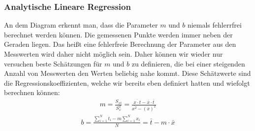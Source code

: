 \documentclass[letterpaper,10pt,english]{jupyterBook}
\begin{document}
\subsubsection{Analytische Lineare Regression }
\label{\detokenize{content/1_Kurvenanpassung:analytische-lineare-regression-a-id-subsec-analytical-linreg-a}}
\sphinxAtStartPar
An dem Diagram erkennt man, dass die Parameter \(m\) und \(b\) niemals fehlerrfrei berechnet werden können. Die gemessenen Punkte werden immer neben der Geraden liegen. Das heißt eine fehlerfreie Berechnung der Parameter aus den Messwerten wird daher nicht möglich sein. Daher können wir wieder nur versuchen beste Schätzungen für \(m\) und \(b\) zu definieren, die bei einer steigenden Anzahl von Messwerten den  Werten beliebig nahe kommt. Diese Schätzwerte sind die Regressionskoeffizienten, welche wir bereits eben definiert hatten und wiefolgt berechnen können:
\begin{equation*}
\begin{split} m = \frac{S_{xt}}{S_{x}^2} = \frac{\overline{x\cdot t} - \overline x \cdot \overline t}{\overline{x^2} - (\overline x)^2}\end{split}
\end{equation*}\begin{equation*}
\begin{split}b = \frac{\sum_{i=1}^N t_i - m \sum_{i=1}^N x_i}{N} = \bar t - m \cdot \bar x\end{split}
\end{equation*}
\end{document}

